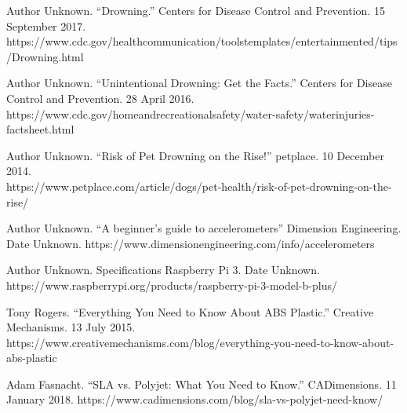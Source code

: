 \begin{thebibliography}{1}
 Author Unknown. “Drowning.” Centers for Disease Control and Prevention. 15 September 2017.\\ https://www.cdc.gov/healthcommunication/toolstemplates/entertainmented/tips/Drowning.html

 Author Unknown. “Unintentional Drowning: Get the Facts.” Centers for Disease Control and Prevention. 28 April 2016. https://www.cdc.gov/homeandrecreationalsafety/water-safety/waterinjuries-factsheet.html

 Author Unknown. “Risk of Pet Drowning on the Rise!” petplace. 10 December 2014. \\https://www.petplace.com/article/dogs/pet-health/risk-of-pet-drowning-on-the-rise/

 Author Unknown. “A beginner's guide to accelerometers” Dimension Engineering. Date Unknown. 
https://www.dimensionengineering.com/info/accelerometers

 Author Unknown. Specifications Raspberry Pi 3. Date Unknown. \\
https://www.raspberrypi.org/products/raspberry-pi-3-model-b-plus/

 Tony Rogers. “Everything You Need to Know About ABS Plastic.” Creative Mechanisms. 13 July 2015.  https://www.creativemechanisms.com/blog/everything-you-need-to-know-about-abs-plastic

 Adam Fasnacht. “SLA vs. Polyjet: What You Need to Know.” CADimensions. 11 January 2018.
https://www.cadimensions.com/blog/sla-vs-polyjet-need-know/
\end{thebibliography}